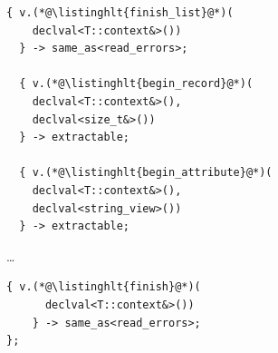 \documentclass[compress,table,xcolor=table]{beamer}
\begin{document}
\begin{frame}[fragile]
\begin{columns}
\begin{column}{.35\textwidth}
\begin{lstlisting}[language=c++2x,basicstyle=\miniscule\ttfamily]
  { v.(*@\listinghlt{finish_list}@*)(
    declval<T::context&>())
  } -> same_as<read_errors>;

  { v.(*@\listinghlt{begin_record}@*)(
    declval<T::context&>(),
    declval<size_t&>())
  } -> extractable;

  { v.(*@\listinghlt{begin_attribute}@*)(
    declval<T::context&>(),
    declval<string_view>())
  } -> extractable;
      \end{lstlisting}
      \ldots
      \begin{lstlisting}[language=c++2x,basicstyle=\miniscule\ttfamily]
    { v.(*@\listinghlt{finish}@*)(
      declval<T::context&>())
    } -> same_as<read_errors>;
};
      \end{lstlisting}
    \end{column}
  \end{columns}
\end{frame}
\end{document}
